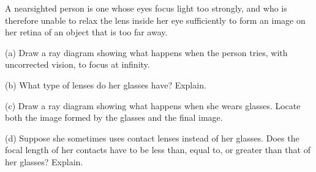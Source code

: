 A nearsighted person is one whose eyes focus light too
strongly, and who is therefore unable to relax the lens
inside her eye sufficiently to form an image on her retina
of an object that is too far away.

(a) Draw a ray diagram showing what happens when the person
tries, with uncorrected vision, to focus at infinity.

(b) What type of lenses do her glasses have? Explain.

(c) Draw a ray diagram showing what happens when she wears
glasses. Locate both the image formed by the glasses
and the final image.

(d) Suppose she sometimes uses contact lenses instead of her
glasses. Does the focal length of her contacts have to be
less than, equal to, or greater than that of her glasses? Explain.
